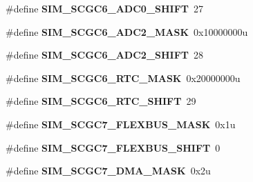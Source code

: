 \begin{DoxyCompactItemize}
\item 
\hypertarget{group___s_i_m___register___masks_ga3f62de5fc5ccaa13d6975cf1e0ebba03}{}\#define {\bfseries S\+I\+M\+\_\+\+S\+C\+G\+C6\+\_\+\+A\+D\+C0\+\_\+\+S\+H\+I\+F\+T}~27\label{group___s_i_m___register___masks_ga3f62de5fc5ccaa13d6975cf1e0ebba03}

\item 
\hypertarget{group___s_i_m___register___masks_ga94fece7af38cc4de88c30a3332fbc4b5}{}\#define {\bfseries S\+I\+M\+\_\+\+S\+C\+G\+C6\+\_\+\+A\+D\+C2\+\_\+\+M\+A\+S\+K}~0x10000000u\label{group___s_i_m___register___masks_ga94fece7af38cc4de88c30a3332fbc4b5}

\item 
\hypertarget{group___s_i_m___register___masks_ga81bba62820852e946b62f27326ed951b}{}\#define {\bfseries S\+I\+M\+\_\+\+S\+C\+G\+C6\+\_\+\+A\+D\+C2\+\_\+\+S\+H\+I\+F\+T}~28\label{group___s_i_m___register___masks_ga81bba62820852e946b62f27326ed951b}

\item 
\hypertarget{group___s_i_m___register___masks_gad51b16006c9f793c4b342ea1ff91a846}{}\#define {\bfseries S\+I\+M\+\_\+\+S\+C\+G\+C6\+\_\+\+R\+T\+C\+\_\+\+M\+A\+S\+K}~0x20000000u\label{group___s_i_m___register___masks_gad51b16006c9f793c4b342ea1ff91a846}

\item 
\hypertarget{group___s_i_m___register___masks_gac04e5a3a7a2848658a30e7c89f791f39}{}\#define {\bfseries S\+I\+M\+\_\+\+S\+C\+G\+C6\+\_\+\+R\+T\+C\+\_\+\+S\+H\+I\+F\+T}~29\label{group___s_i_m___register___masks_gac04e5a3a7a2848658a30e7c89f791f39}

\item 
\hypertarget{group___s_i_m___register___masks_ga93f819afb387ad8aa57896e43ab0e795}{}\#define {\bfseries S\+I\+M\+\_\+\+S\+C\+G\+C7\+\_\+\+F\+L\+E\+X\+B\+U\+S\+\_\+\+M\+A\+S\+K}~0x1u\label{group___s_i_m___register___masks_ga93f819afb387ad8aa57896e43ab0e795}

\item 
\hypertarget{group___s_i_m___register___masks_ga624734f9006b5f488a9e1f789e1e3bde}{}\#define {\bfseries S\+I\+M\+\_\+\+S\+C\+G\+C7\+\_\+\+F\+L\+E\+X\+B\+U\+S\+\_\+\+S\+H\+I\+F\+T}~0\label{group___s_i_m___register___masks_ga624734f9006b5f488a9e1f789e1e3bde}

\item 
\hypertarget{group___s_i_m___register___masks_gac559e129885604991932101719e3b368}{}\#define {\bfseries S\+I\+M\+\_\+\+S\+C\+G\+C7\+\_\+\+D\+M\+A\+\_\+\+M\+A\+S\+K}~0x2u\label{group___s_i_m___register___masks_gac559e129885604991932101719e3b368}


\end{DoxyCompactItemize}
